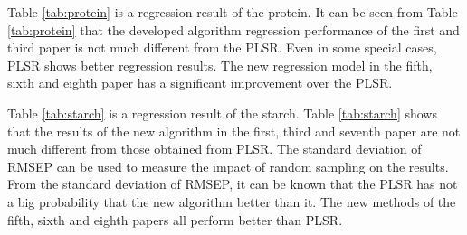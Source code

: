 \documentclass[a4paper,12pt,titlepage]{article} %
\numberwithin{equation}{section}  %
\begin{document}
	
	Table \ref{tab:protein} is a regression result of the protein. It can be seen from Table \ref{tab:protein} that the developed algorithm regression performance of the first and third paper is not much different from the PLSR. Even in some special cases, PLSR shows better regression results. The new regression model in the fifth, sixth and eighth paper has a significant improvement over the PLSR.
	
	
	Table \ref{tab:starch} is a regression result of the starch. Table \ref{tab:starch} shows that the results of the new algorithm in the first, third and seventh paper are not much different from those obtained from PLSR. The standard deviation of RMSEP can be used to measure the impact of random sampling on the results. From the standard deviation of RMSEP, it can be known that the PLSR has not a big probability that the new algorithm better than it. The new methods of the fifth, sixth and eighth papers all perform better than PLSR.
	
\end{document}
